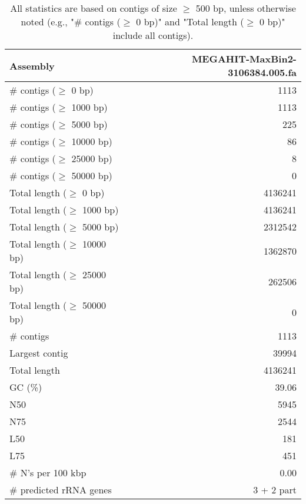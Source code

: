 \documentclass[12pt,a4paper]{article}
\begin{document}
\begin{table}[ht]
\begin{center}
\caption{All statistics are based on contigs of size $\geq$ 500 bp, unless otherwise noted (e.g., "\# contigs ($\geq$ 0 bp)" and "Total length ($\geq$ 0 bp)" include all contigs).}
\begin{tabular}{|l*{1}{|r}|}
\hline
Assembly & MEGAHIT-MaxBin2-3106384.005.fa \\ \hline
\# contigs ($\geq$ 0 bp) & 1113 \\ \hline
\# contigs ($\geq$ 1000 bp) & 1113 \\ \hline
\# contigs ($\geq$ 5000 bp) & 225 \\ \hline
\# contigs ($\geq$ 10000 bp) & 86 \\ \hline
\# contigs ($\geq$ 25000 bp) & 8 \\ \hline
\# contigs ($\geq$ 50000 bp) & 0 \\ \hline
Total length ($\geq$ 0 bp) & 4136241 \\ \hline
Total length ($\geq$ 1000 bp) & 4136241 \\ \hline
Total length ($\geq$ 5000 bp) & 2312542 \\ \hline
Total length ($\geq$ 10000 bp) & 1362870 \\ \hline
Total length ($\geq$ 25000 bp) & 262506 \\ \hline
Total length ($\geq$ 50000 bp) & 0 \\ \hline
\# contigs & 1113 \\ \hline
Largest contig & 39994 \\ \hline
Total length & 4136241 \\ \hline
GC (\%) & 39.06 \\ \hline
N50 & 5945 \\ \hline
N75 & 2544 \\ \hline
L50 & 181 \\ \hline
L75 & 451 \\ \hline
\# N's per 100 kbp & 0.00 \\ \hline
\# predicted rRNA genes & 3 + 2 part \\ \hline
\end{tabular}
\end{center}
\end{table}
\end{document}
